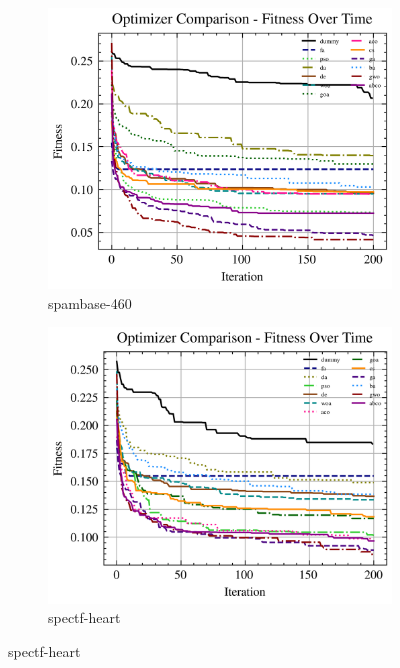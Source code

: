 \begin{figure}[htp]
    \centering
    \begin{subfigure}[b]{0.45\textwidth}
        \includegraphics[width=\textwidth]{imagenes/fitness_charts/img/binary/spambase-460/optimizers_fitness_knn.png}
        \caption{spambase-460}
        \label{fig:convergencia_spambase-460_knn}
    \end{subfigure}
    \begin{subfigure}[b]{0.45\textwidth}
        \includegraphics[width=\textwidth]{imagenes/fitness_charts/img/binary/spectf-heart/optimizers_fitness_knn.png}
        \caption{spectf-heart}
        \label{fig:convergencia_spectf-heart_knn}
    \end{subfigure}


\end{figure}
